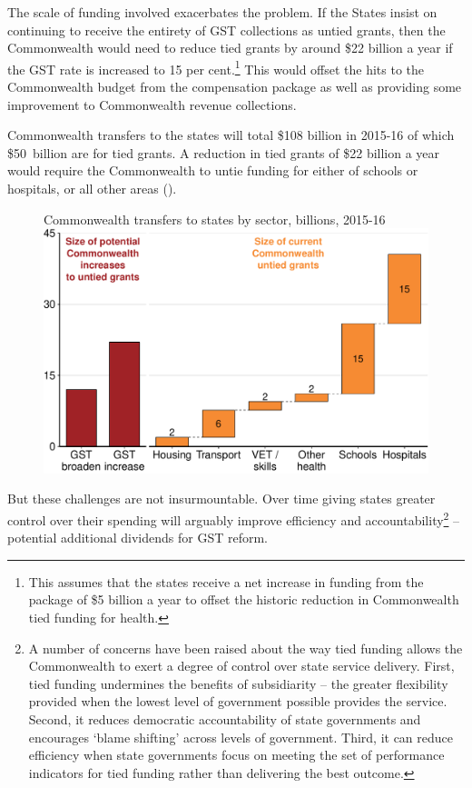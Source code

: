 The scale of funding involved exacerbates the problem. If the States insist on continuing to receive the entirety of GST collections as untied grants, then the Commonwealth would need to reduce tied grants by around \$22 billion a year if the GST rate is increased to 15 per cent.\footnote{This assumes that the states receive a net increase in funding from the package of \$5 billion a year to offset the historic reduction in Commonwealth tied funding for health.}   This would offset the hits to the Commonwealth budget from the compensation package as well as providing some improvement to Commonwealth revenue collections.

Commonwealth transfers to the states will total \$108 billion in \mbox{2015-16} of which \$50~billion are for tied grants. A reduction in tied grants of \$22 billion a year would require the Commonwealth to untie funding for either of schools or hospitals, or all other areas (). 

\begin{figure}
%
{Commonwealth transfers to states by sector, billions, 2015-16}
\includegraphics[width=\columnwidth]{atlas/figure/GST-Figure-10-2.pdf}
\end{figure}

But these challenges are not insurmountable. Over time giving states greater control over their spending will arguably improve efficiency and accountability\footnote{ A number of concerns have been raised about the way tied funding allows the Commonwealth to exert a degree of control over state service delivery. First, tied funding undermines the benefits of subsidiarity – the greater flexibility provided when the lowest level of government possible provides the service. Second, it reduces democratic accountability of state governments and encourages ‘blame shifting’ across levels of government. Third, it can reduce efficiency when state governments focus on meeting the set of performance indicators for tied funding rather than delivering the best outcome.}  – potential additional dividends for GST reform.

